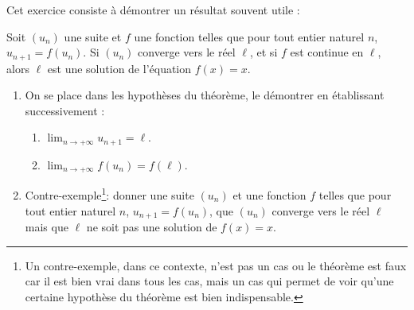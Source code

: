 \documentclass[a4paper,11pt,DIV12,BCOR0mm]{scrartcl}
\begin{document}
\begin{exercice}
 Cet exercice consiste à démontrer un résultat souvent utile :
\begin{theoreme}
 Soit $(u_n)$ une suite et $f$ une fonction telles que pour tout entier naturel $n$, 
$u_{n+1}=f(u_n)$. Si $(u_n)$ converge vers le réel $\ell$, et
si $f$ est continue en $\ell$, alors $\ell$ est une solution de l'équation $f(x)=x$.
\end{theoreme}
\begin{enumerate}
 \item On se place dans les hypothèses du théorème, le démontrer 
en établissant successivement :\begin{enumerate}
 \item $\displaystyle\lim_{n\to+\infty}u_{n+1}=\ell.$
 \item $\displaystyle\lim_{n\to+\infty}f(u_n)=f(\ell).$
\end{enumerate}
  \item \og Contre-exemple\footnote{Un contre-exemple, dans ce contexte,
n'est pas un cas ou le théorème est faux car il est bien vrai dans tous les cas, mais
un cas qui permet de voir qu'une certaine hypothèse du théorème est bien indispensable.}\fg : donner une suite $(u_n)$ et une fonction $f$ telles que pour tout entier naturel $n$, 
$u_{n+1}=f(u_n)$, que $(u_n)$ converge vers le réel $\ell$ mais que $\ell$ ne soit pas une 
solution de $f(x)=x$.
\end{enumerate}


\end{exercice}
\end{document}
